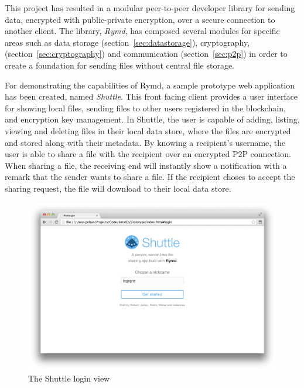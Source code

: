 
This project has resulted in a modular peer-to-peer developer library for sending data, encrypted with public-private encryption, over a secure connection to another client. The library, \emph{Rymd}, has composed several modules for specific areas such as data storage (section~\ref{sec:datastorage}), cryptography, (section~\ref{sec:cryptography}) and communication (section~\ref{sec:p2p}) in order to create a foundation for sending files without central file storage.

For demonstrating the capabilities of Rymd, a sample prototype web application has been created, named \emph{Shuttle}. This front facing client provides a user interface for showing local files, sending files to other users registered in the blockchain, and encryption key management. In Shuttle, the user is capable of adding, listing, viewing and deleting files in their local data store, where the files are encrypted and stored along with their metadata. By knowing a recipient's username, the user is able to share a file with the recipient over an encrypted P2P connection. When sharing a file, the receiving end will instantly show a notification with a remark that the sender wants to share a file. If the recipient choses to accept the sharing request, the file will download to their local data store.

\begin{figure}[h]
\centering
\includegraphics[width=\textwidth,height=0.2\paperheight,keepaspectratio
]{figures/shuttle-login}
\caption{The Shuttle login view}
\label{fig:shuttle-login}
\end{figure}

